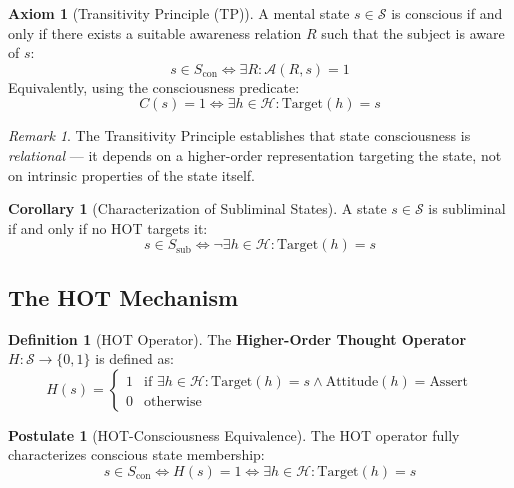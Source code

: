 \documentclass[11pt,a4paper]{article}
\theoremstyle{definition}
\newtheorem{definition}{Definition}[section]
\newtheorem{axiom}{Axiom}[section]
\newtheorem{postulate}{Postulate}[section]
\newtheorem{corollary}{Corollary}[section]
\theoremstyle{remark}
\newtheorem*{remark}{Remark}
\newcommand{\Sset}{\mathcal{S}}
\newcommand{\Hset}{\mathcal{H}}
\newcommand{\A}{\mathcal{A}}
\newcommand{\Scon}{S_{\text{con}}}
\newcommand{\Ssub}{S_{\text{sub}}}
\newcommand{\Target}{\text{Target}}
\newcommand{\Attitude}{\text{Attitude}}
\begin{document}
\begin{axiom}[Transitivity Principle (TP)]
\label{ax:TP}
A mental state $s \in \Sset$ is conscious if and only if there exists a suitable awareness relation $R$ such that the subject is aware of $s$:
\begin{equation}
\boxed{s \in \Scon \iff \exists R : \A(R, s) = 1}
\end{equation}
Equivalently, using the consciousness predicate:
\begin{equation}
C(s) = 1 \iff \exists h \in \Hset : \Target(h) = s
\end{equation}
\end{axiom}

\begin{remark}
The Transitivity Principle establishes that state consciousness is \textit{relational} --- it depends on a higher-order representation targeting the state, not on intrinsic properties of the state itself.
\end{remark}

\begin{corollary}[Characterization of Subliminal States]
\label{cor:subliminal}
A state $s \in \Sset$ is subliminal if and only if no HOT targets it:
\begin{equation}
s \in \Ssub \iff \neg\exists h \in \Hset : \Target(h) = s
\end{equation}
\end{corollary}

\subsection{The HOT Mechanism}

\begin{definition}[HOT Operator]
\label{def:HOT}
The \textbf{Higher-Order Thought Operator} $H: \Sset \to \{0,1\}$ is defined as:
\begin{equation}
H(s) =
\begin{cases}
1 & \text{if } \exists h \in \Hset : \Target(h) = s \land \Attitude(h) = \text{Assert} \\
0 & \text{otherwise}
\end{cases}
\end{equation}
\end{definition}

\begin{postulate}[HOT-Consciousness Equivalence]
\label{post:HOT-equiv}
The HOT operator fully characterizes conscious state membership:
\begin{equation}
\boxed{s \in \Scon \iff H(s) = 1 \iff \exists h \in \Hset : \Target(h) = s}
\end{equation}
\end{postulate}
\end{document}
